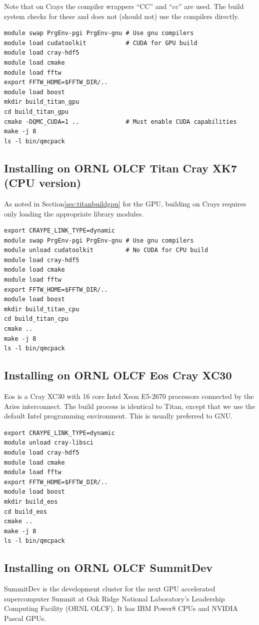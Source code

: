 Note that on Crays the compiler wrappers ``CC'' and ``cc'' are
used. The build system checks for these and does not (should not) use
the compilers directly.

\begin{verbatim}
module swap PrgEnv-pgi PrgEnv-gnu # Use gnu compilers
module load cudatoolkit           # CUDA for GPU build
module load cray-hdf5
module load cmake
module load fftw
export FFTW_HOME=$FFTW_DIR/..
module load boost
mkdir build_titan_gpu
cd build_titan_gpu
cmake -DQMC_CUDA=1 ..             # Must enable CUDA capabilities
make -j 8
ls -l bin/qmcpack
\end{verbatim}

\subsection{Installing on ORNL OLCF Titan Cray XK7 (CPU version)}
As noted in Section\ref{sec:titanbuildgpu} for the GPU, building on
Crays requires only loading the appropriate library modules.

\begin{verbatim}
export CRAYPE_LINK_TYPE=dynamic
module swap PrgEnv-pgi PrgEnv-gnu # Use gnu compilers
module unload cudatoolkit         # No CUDA for CPU build
module load cray-hdf5
module load cmake
module load fftw
export FFTW_HOME=$FFTW_DIR/..
module load boost
mkdir build_titan_cpu
cd build_titan_cpu
cmake ..
make -j 8
ls -l bin/qmcpack
\end{verbatim}

\subsection{Installing on ORNL OLCF Eos Cray XC30}
Eos is a Cray XC30 with 16 core Intel Xeon E5-2670 processors connected
by the Aries interconnect. The build process is identical to Titan,
except that we use the default Intel programming environment. This is
usually preferred to GNU.
\begin{verbatim}
export CRAYPE_LINK_TYPE=dynamic
module unload cray-libsci
module load cray-hdf5
module load cmake
module load fftw
export FFTW_HOME=$FFTW_DIR/..
module load boost
mkdir build_eos
cd build_eos
cmake ..
make -j 8
ls -l bin/qmcpack
\end{verbatim}

\subsection{Installing on ORNL OLCF SummitDev}
SummitDev is the development cluster for the next GPU accelerated
supercomputer Summit at Oak Ridge National Laboratory's
Leadership Computing Facility  (ORNL OLCF). It has IBM Power8 CPUs and NVIDIA Pascal GPUs.

